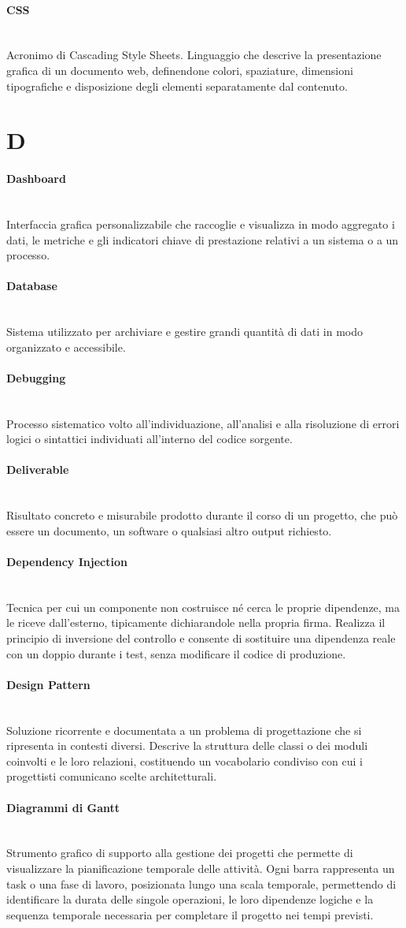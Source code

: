 \documentclass[a4paper, 10pt, colorlinks=true, linkcolor=black, urlcolor=blue, citecolor=blue, hidelinks]{article}
\newcommand{\glossaryterm}[2]{
    \paragraph{#1 \label{term:#1}} \mbox{} \\
    #2
    \vspace{0.5em}
}
\begin{document}
\glossaryterm{CSS}{Acronimo di Cascading Style Sheets. Linguaggio che descrive la presentazione grafica di un documento web, definendone colori, spaziature, dimensioni tipografiche e disposizione degli elementi separatamente dal contenuto.}

\newpage

\section*{D}

\glossaryterm{Dashboard}{Interfaccia grafica personalizzabile che raccoglie e visualizza in modo aggregato i dati, le metriche e gli indicatori chiave di prestazione relativi a un sistema o a un processo.}

\glossaryterm{Database}{Sistema utilizzato per archiviare e gestire grandi quantità di dati in modo organizzato e accessibile.}

\glossaryterm{Debugging}{Processo sistematico volto all'individuazione, all'analisi e alla risoluzione di errori logici o sintattici individuati all'interno del codice sorgente.}

\glossaryterm{Deliverable}{Risultato concreto e misurabile prodotto durante il corso di un progetto, che può essere un documento, un software o qualsiasi altro output richiesto.}

\glossaryterm{Dependency Injection}{Tecnica per cui un componente non costruisce né cerca le proprie dipendenze, ma le riceve dall'esterno, tipicamente dichiarandole nella propria firma. Realizza il principio di inversione del controllo e consente di sostituire una dipendenza reale con un doppio durante i test, senza modificare il codice di produzione.}

\glossaryterm{Design Pattern}{Soluzione ricorrente e documentata a un problema di progettazione che si ripresenta in contesti diversi. Descrive la struttura delle classi o dei moduli coinvolti e le loro relazioni, costituendo un vocabolario condiviso con cui i progettisti comunicano scelte architetturali.}

\glossaryterm{Diagrammi di Gantt}{Strumento grafico di supporto alla gestione dei progetti che permette di visualizzare la pianificazione temporale delle attività. Ogni barra rappresenta un task o una fase di lavoro, posizionata lungo una scala temporale, permettendo di identificare la durata delle singole operazioni, le loro dipendenze logiche e la sequenza temporale necessaria per completare il progetto nei tempi previsti.}
\end{document}
